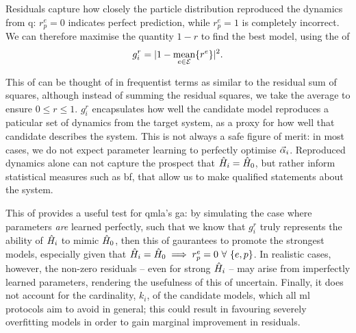 Residuals capture how closely the \gls{particle} distribution reproduced the dynamics from \gls{q}:
    $r^{e}_{p} = 0$ indicates perfect prediction, while $r^e_p=1$ is completely incorrect. 
We can therefore maximise the quantity $1-r$ to find the best model, 
    using the \gls{of}
\begin{equation}
    \label{eqn:residual_fitness}
    g^r_i = \lvert 1 - \underset{e \in { \mathcal{E} }}{\text{mean}}\{ {r^e} \}\rvert^2.
\end{equation}
\par     
This \gls{of} can be thought of in frequentist terms 
    as similar to the residual sum of squares,
    although instead of summing the residual squares, we take the average to ensure $0 \leq r \leq 1$. 
$g_i^r$ encapsulates how well the candidate model reproduces a paticular set of dynamics from the target system, 
    as a proxy for how well that candidate describes the system. 
This is not always a safe figure of merit: 
    in most cases, we do not expect parameter learning to perfectly optimise $\vec{\alpha}_i$. 
Reproduced dynamics alone can not capture the prospect that $\hat{H}_i=\hat{H}_0$, 
    but rather inform statistical measures such as \gls{bf},
    that allow us to make qualified statements about the system. \par 

This \gls{of} provides a useful test for \gls{qmla}'s \gls{ga}:
    by simulating the case where parameters \emph{are} learned perfectly, 
    such that we know that $g_i^r$ truly represents the ability of $\hat{H}_i$ to 
    mimic $\hat{H}_0$, then this \gls{of} gaurantees to promote  the strongest models,
    especially given that $\hat{H}_i=\hat{H}_0 \implies r_p^e=0 \ \forall \ \{e, p\}$. 
In realistic cases, however, the non-zero residuals -- even for 
    strong $\hat{H}_i$ -- may arise from imperfectly learned parameters,
    rendering the usefulness of this \gls{of} uncertain. 
Finally, it does not account for the cardinality, $k_i$, of the candidate models,
    which all \gls{ml} protocols aim to avoid in general;
    this could result in favouring severely overfitting models in order to 
    gain marginal improvement in residuals.

